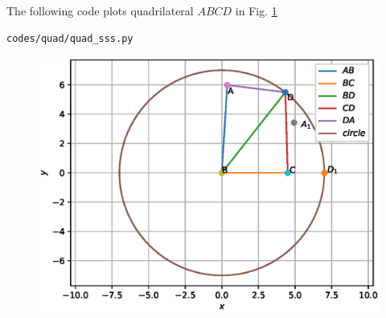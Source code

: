 \begin{enumerate}[label=\arabic*.,ref=\thesubsection.\theenumi]
The following code plots quadrilateral $ABCD$ in Fig. \ref{fig:quad}
\begin{lstlisting}
codes/quad/quad_sss.py
\end{lstlisting}
\begin{figure}[!ht]
\includegraphics[width=\columnwidth]{./figs/quad/quad_sss.eps}
\caption{}
\label{fig:quad}
\end{figure}
%
\end{enumerate}
%
